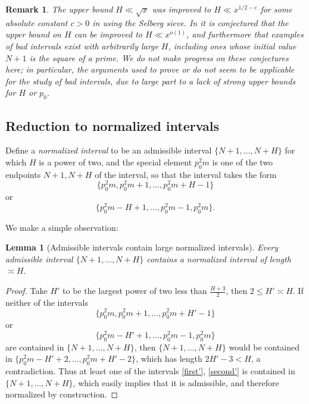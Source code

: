 \documentclass[12pt]{amsart}
\newtheorem{lemma}[theorem]{Lemma}
\newtheorem{remark}[theorem]{Remark}
\begin{document}
\begin{remark} The upper bound $H \ll \sqrt{x}$ was improved to $H \ll x^{1/2-c}$ for some absolute constant $c>0$ in \cite{ramachandra} using the Selberg sieve. In \cite[p.73]{eg} it is conjectured that the upper bound on $H$ can be improved to $H \ll x^{o(1)}$, and furthermore that examples of bad intervals exist with arbitrarily large $H$, including ones whose initial value $N+1$ is the square of a prime. We do not make progress on these conjectures here; in particular, the arguments used to prove  or  do not seem to be applicable for the study of bad intervals, due to large part to a lack of strong upper bounds for $H$ or $p_0$.
\end{remark}

\subsection{Reduction to normalized intervals}

Define a \emph{normalized interval} to be an admissible interval $\{N+1,\dots,N+H\}$ for which $H$ is a power of two, and the special element $p_0^2 m$ is one of the two endpoints $N+1, N+H$ of the interval, so that the interval takes the form
\begin{equation}\label{first}
 \{ p_0^2 m, p_0^2 m + 1, \dots, p_0^2 m + H - 1 \}
\end{equation}
or
\begin{equation}\label{second}
 \{ p_0^2 m - H + 1, \dots, p_0^2 m - 1, p_0^2 m \}.
\end{equation}

We make a simple observation:

\begin{lemma}[Admissible intervals contain large normalized intervals]\label{lem-norm}  Every admissible interval $\{N+1,\dots,N+H\}$ contains a normalized interval of length $\asymp H$.
\end{lemma}

\begin{proof}
Take $H'$ to be the largest power of two less than $\frac{H+3}{2}$, then $2 \leq H' \asymp H$.  If neither of the intervals
\begin{equation}\label{first'}
 \{ p_0^2 m, p_0^2 m + 1, \dots, p_0^2 m + H' - 1 \}
\end{equation}
or
\begin{equation}\label{second'}
 \{ p_0^2 m - H' + 1, \dots, p_0^2 m - 1, p_0^2 m \}
\end{equation}
are contained in $\{N+1,\dots,N+H\}$, then $\{N+1,\dots,N+H\}$ would be contained in $\{p_0^2 m - H'+2,\dots,p_0^2 m + H' - 2\}$, which has length $2H'-3 < H$, a contradiction.  Thus at least one of the intervals \eqref{first'}, \eqref{second'} is contained in $\{N+1,\dots,N+H\}$, which easily implies that it is admissible, and therefore normalized by construction.
\end{proof}
\end{document}
